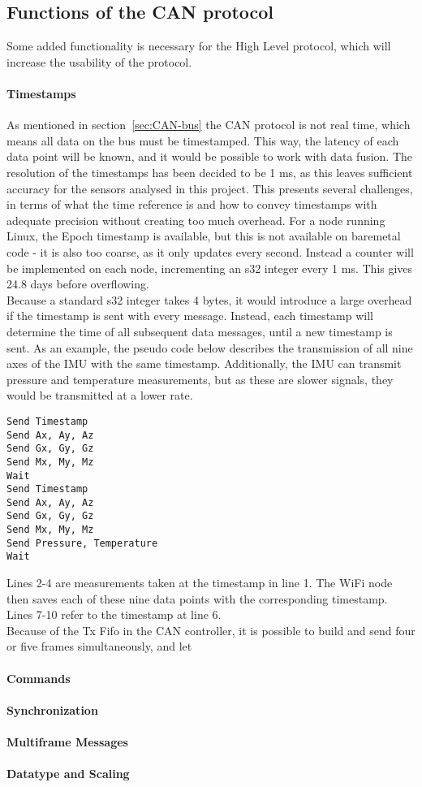 \subsection{Functions of the CAN protocol}\label{sec:CAN_functions}
Some added functionality is necessary for the High Level protocol, which will increase the usability of the protocol.

\paragraph*{Timestamps}
As mentioned in section~\ref{sec:CAN-bus} the CAN protocol is not real time, which means all data on the bus must be timestamped. 
This way, the latency of each data point will be known, and it would be possible to work with data fusion.
The resolution of the timestamps has been decided to be 1 ms, as this leaves sufficient accuracy for the sensors analysed in this project.
This presents several challenges, in terms of what the time reference is and how to convey timestamps with adequate precision without creating too much overhead. 
For a node running Linux, the Epoch timestamp is available, but this is not available on baremetal code - it is also too coarse, as it only updates every second.
Instead a counter will be implemented on each node, incrementing an s32 integer every 1 ms.
This gives 24.8 days before overflowing.\\

Because a standard s32 integer takes 4 bytes, it would introduce a large overhead if the timestamp is sent with every message. 
Instead, each timestamp will determine the time of all subsequent data messages, until a new timestamp is sent. 
As an example, the pseudo code below describes the transmission of all nine axes of the IMU with the same timestamp.
Additionally, the IMU can transmit pressure and temperature measurements, but as these are slower signals, they would be transmitted at a lower rate.

\begin{lstlisting}
Send Timestamp
Send Ax, Ay, Az
Send Gx, Gy, Gz
Send Mx, My, Mz
Wait
Send Timestamp
Send Ax, Ay, Az
Send Gx, Gy, Gz
Send Mx, My, Mz
Send Pressure, Temperature
Wait
\end{lstlisting}

Lines 2-4 are measurements taken at the timestamp in line 1.
The WiFi node then saves each of these nine data points with the corresponding timestamp.
Lines 7-10 refer to the timestamp at line 6.\\
Because of the Tx Fifo in the CAN controller, it is possible to build and send four or five frames simultaneously, and let 


\paragraph*{Commands}

\paragraph*{Synchronization}

\paragraph*{Multiframe Messages}

\paragraph*{Datatype and Scaling}